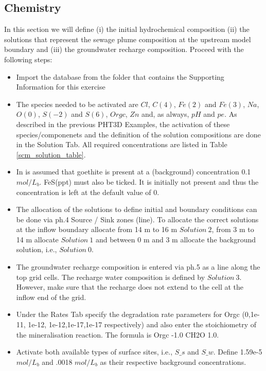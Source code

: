 \subsection{Chemistry}

In this section we will define (i) the initial hydrochemical 
composition (ii) the solutions that represent the sewage
plume composition at the upstream model boundary
and (iii) the groundwater recharge composition. 
Proceed with the following steps:

\begin{itemize}

\item Import the database from the folder that contains the Supporting Information for this exercise


\item The species needed to be activated are $Cl$, $C(4)$, 
$Fe(2)$ and $Fe(3)$, $Na$, $O(0)$, $S(-2)$ and $S(6)$, $Orgc$, $Zn$ and, as always, $pH$ and $pe$. 
As described in the previous PHT3D Examples, the activation of these species/componenets 
and the definition of the solution compositions are done in the {\color{blue}Solution Tab}. 
All required concentrations are listed in Table \ref{scm_solution_table}.

\item In is assumed that goethite is present at a (background) concentration 0.1 $mol/L_b$. 
FeS(ppt) must also be ticked. It is initially not present and thus the concentration
is left at the default value of 0.

\item The allocation of the solutions to define initial and boundary conditions
can be done via {\color{blue}ph.4 Source / Sink} zones (line). 
To allocate the correct solutions at the inflow boundary allocate 
from 14 m to 16 m $Solution\ 2$, from 3 m to 14 m 
allocate $Solution\ 1$ and between 0 m and 3 m allocate the background solution,
i.e., $Solution\ 0$.

\item The groundwater recharge composition is entered via {\color{blue}ph.5} as a line along 
the top grid cells. The recharge water composition is defined by $Solution\ 3$.
However, make sure that the recharge does not extend to the cell at the inflow end of the grid.   

\item Under the {\color{blue}Rates Tab} specify the degradation rate 
parameters for Orgc (0,1e-11, 1e-12, 1e-12,1e-17,1e-17 respectively) and also 
enter the stoichiometry of the mineralisation 
reaction. The formula is 
Orgc -1.0 CH2O 1.0.

\item Activate both available types of surface sites, i.e., $S\_s$ and $S\_w$.
Define 1.59e-5 $mol/L_b$ and .0018 $mol/L_b$ as their respective background concentrations.


\end{itemize}

